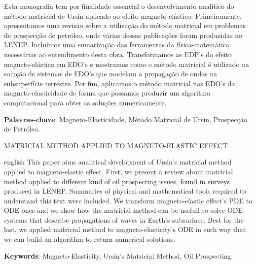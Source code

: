 \documentclass[12pt,a4paper,oneside]{abntex2}
\begin{document}
\begin{resumo}
Esta monografia tem por finalidade essencial o desenvolvimento anal\'itico do m\'etodo matricial de Ursin aplicado ao efeito magneto-el\'astico. Primeiramente, apresentamos uma revis\~ao sobre a utiliza\c{c}\~ao do m\'etodo matricial em problemas de prospec\c{c}\~ao de petr\'oleo, onde v\'arias dessas publica\c{c}\~oes foram produzidas no LENEP. Inclu\'imos uma sumariza\c{c}\~ao das ferramentas da f\'isica-matem\'atica necess\'arias ao entendimento desta obra. Transformamos as EDP's do efeito magneto-el\'astico em EDO's e mostramos como o m\'etodo matricial \'e utilizado na solu\c{c}\~ao de sistemas de EDO's que modelam a propaga\c{c}\~ao de ondas na subsuperf\'icie terrestre. Por fim, aplicamos o m\'etodo matricial nas EDO's da magneto-elasticidade de forma que possamos produzir um algoritmo computacional para obter as solu\c{c}\~oes numericamente.

\vspace{\onelineskip} 
\noindent 
\textbf{Palavras-chave}: Magneto-Elasticidade, M\'etodo Matricial de Ursin, Prospec\c{c}\~ao de Petr\'oleo.
\end{resumo}

\begin{center}
{\ABNTEXchapterfont\Large MATRICIAL METHOD APPLIED TO MAGNETO-ELASTIC EFFECT}\\\vspace{1cm}
\end{center}

\begin{resumo}[Abstract]
\begin{otherlanguage*}{english}
This paper aims analitical development of Ursin's matricial method applied to magneto-elastic effect. First, we present a review about matricial method applied to different kind of oil prospecting issues, found in surveys produced in LENEP. Summaries of physical and mathematical tools required to understand this text were included. We transform magneto-elastic effect's PDE to ODE ones and we show how the matricial method can be usefull to solve ODE systems that describe propagations of waves in Earth's subsurface. Best for the last, we applied matricial method to magneto-elasticity's ODE in such way that we can build an algorithm to return numerical solutions.

\vspace{\onelineskip} 
\noindent 
\textbf{Keywords}: Magneto-Elasticity, Ursin's Matricial Method, Oil Prospecting.

\end{otherlanguage*}
\end{resumo}
\end{document}

